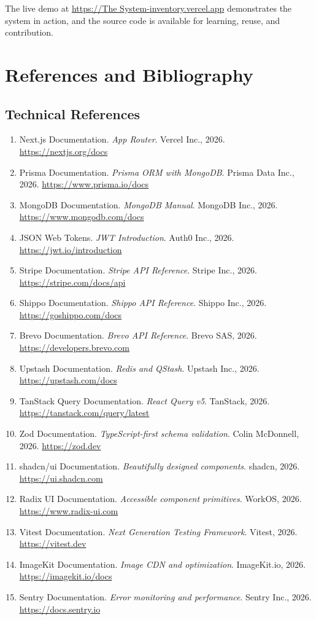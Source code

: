 \documentclass[12pt,a4paper]{report}
\begin{document}
The live demo at \url{https://The System-inventory.vercel.app} demonstrates the system in action, and the source code is available for learning, reuse, and contribution.





\appendix

\chapter*{References and Bibliography}
\section{Technical References}

\begin{enumerate}[leftmargin=1.5em]
  \item Next.js Documentation. \textit{App Router}. Vercel Inc., 2026. \url{https://nextjs.org/docs}
  \item Prisma Documentation. \textit{Prisma ORM with MongoDB}. Prisma Data Inc., 2026. \url{https://www.prisma.io/docs}
  \item MongoDB Documentation. \textit{MongoDB Manual}. MongoDB Inc., 2026. \url{https://www.mongodb.com/docs}
  \item JSON Web Tokens. \textit{JWT Introduction}. Auth0 Inc., 2026. \url{https://jwt.io/introduction}
  \item Stripe Documentation. \textit{Stripe API Reference}. Stripe Inc., 2026. \url{https://stripe.com/docs/api}
  \item Shippo Documentation. \textit{Shippo API Reference}. Shippo Inc., 2026. \url{https://goshippo.com/docs}
  \item Brevo Documentation. \textit{Brevo API Reference}. Brevo SAS, 2026. \url{https://developers.brevo.com}
  \item Upstash Documentation. \textit{Redis and QStash}. Upstash Inc., 2026. \url{https://upstash.com/docs}
  \item TanStack Query Documentation. \textit{React Query v5}. TanStack, 2026. \url{https://tanstack.com/query/latest}
  \item Zod Documentation. \textit{TypeScript-first schema validation}. Colin McDonnell, 2026. \url{https://zod.dev}
  \item shadcn/ui Documentation. \textit{Beautifully designed components}. shadcn, 2026. \url{https://ui.shadcn.com}
  \item Radix UI Documentation. \textit{Accessible component primitives}. WorkOS, 2026. \url{https://www.radix-ui.com}
  \item Vitest Documentation. \textit{Next Generation Testing Framework}. Vitest, 2026. \url{https://vitest.dev}
  \item ImageKit Documentation. \textit{Image CDN and optimization}. ImageKit.io, 2026. \url{https://imagekit.io/docs}
  \item Sentry Documentation. \textit{Error monitoring and performance}. Sentry Inc., 2026. \url{https://docs.sentry.io}
\end{enumerate}
\end{document}
